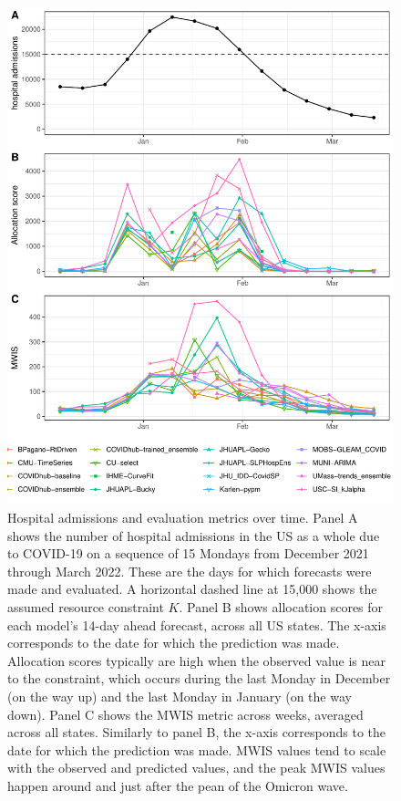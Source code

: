 \documentclass{article}\usepackage[]{graphicx}\usepackage[]{xcolor}
\makeatletter
\def\maxwidth{ %
  \ifdim\Gin@nat@width>\linewidth
    \linewidth
  \else
    \Gin@nat@width
  \fi
}
\newenvironment{knitrout}{}{} %
\makeatother
\begin{document}
\begin{knitrout}
\color{fgcolor}\begin{figure}
\includegraphics[width=\maxwidth]{figure/metrics-over-time-1} \caption[Hospital admissions and evaluation metrics over time]{Hospital admissions and evaluation metrics over time. Panel A shows the number of hospital admissions in the US as a whole due to COVID-19 on a sequence of 15 Mondays from December 2021 through March 2022. These are the days for which forecasts were made and evaluated. A horizontal dashed line at 15,000 shows the assumed resource constraint $K$. Panel B shows allocation scores for each model's 14-day ahead forecast, across all US states. The x-axis corresponds to the date for which the prediction was made. Allocation scores typically are high when the observed value is near to the constraint, which occurs during the last Monday in December (on the way up) and the last Monday in January (on the way down). Panel C shows the MWIS metric across weeks, averaged across all states. Similarly to panel B, the x-axis corresponds to the date for which the prediction was made. MWIS values tend to scale with the observed and predicted values, and the peak MWIS values happen around and just after the pean of the Omicron wave.}\label{fig:metrics-over-time}
\end{figure}

\end{knitrout}
\end{document}
